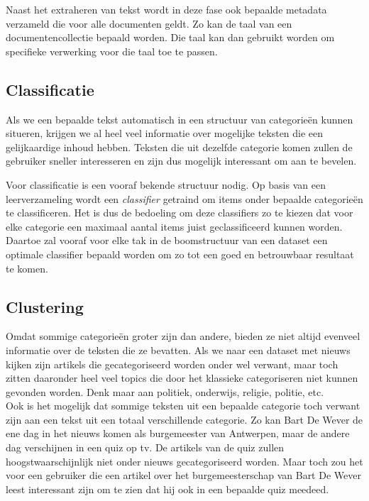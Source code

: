 Naast het extraheren van tekst wordt in deze fase ook bepaalde metadata verzameld die voor alle documenten geldt. Zo kan de taal van een documentencollectie bepaald worden. Die taal kan dan gebruikt worden om specifieke verwerking voor die taal toe te passen. 

\subsection{Classificatie}
Als we een bepaalde tekst automatisch in een structuur van categorie\"en kunnen situeren, krijgen we al heel veel informatie over mogelijke teksten die een gelijkaardige inhoud hebben. Teksten die uit dezelfde categorie komen zullen de gebruiker sneller interesseren en zijn dus mogelijk interessant om aan te bevelen. 

Voor classificatie is een vooraf bekende structuur nodig. Op basis van een leerverzameling wordt een \textit{classifier} getraind om items onder bepaalde categorie\"en te classificeren. Het is dus de bedoeling om deze classifiers zo te kiezen dat voor elke categorie een maximaal aantal items juist geclassificeerd kunnen worden. Daartoe zal vooraf voor elke tak in de boomstructuur van een dataset een optimale classifier bepaald worden om zo tot een goed en betrouwbaar resultaat te komen.

\subsection{Clustering}
Omdat sommige categorie\"en groter zijn dan andere, bieden ze niet altijd evenveel informatie over de teksten die ze bevatten. Als we naar een dataset met nieuws kijken zijn artikels die gecategoriseerd worden onder  wel verwant, maar toch zitten daaronder heel veel topics die door het klassieke categoriseren niet kunnen gevonden worden. Denk maar aan politiek, onderwijs, religie, politie, etc.
\\Ook is het mogelijk dat sommige teksten uit een bepaalde categorie toch verwant zijn aan een tekst uit een totaal verschillende categorie. Zo kan Bart De Wever de ene dag in het nieuws komen als burgemeester van Antwerpen, maar de andere dag verschijnen in een quiz op tv. De artikels van de quiz zullen hoogstwaarschijnlijk niet onder nieuws gecategoriseerd worden. Maar toch zou het voor een gebruiker die een artikel over het burgemeesterschap van Bart De Wever leest interessant zijn om te zien dat hij ook in een bepaalde quiz meedeed. 

